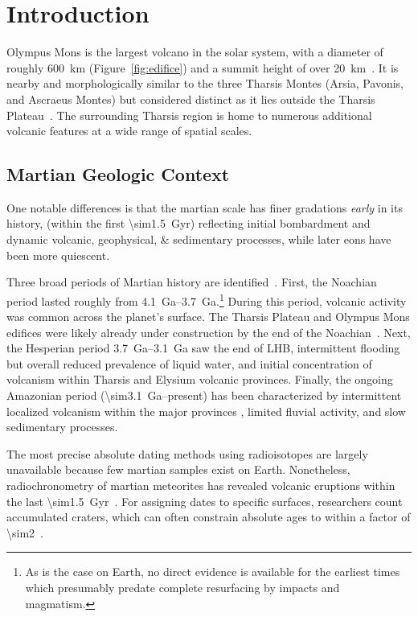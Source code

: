 \chapter{Introduction}

Olympus Mons is the largest volcano in the solar system, with a diameter of roughly \qty{600}{\km} (Figure~\ref{fig:edifice}) and a summit height of over \qty{20}{\km}~\parencite{plescia_morphometric_2004}. It is nearby and morphologically similar to the three Tharsis Montes (Arsia, Pavonis, and Ascraeus Montes) but considered distinct as it lies outside the Tharsis Plateau~\parencite{bleacher_trends_2007}. The surrounding Tharsis region is home to numerous additional volcanic features at a wide range of spatial scales.

\section{Martian Geologic Context}

One notable differences is that the martian scale has finer gradations \textit{early} in its history, (within the first \qty{\sim1.5}{Gyr}) reflecting initial bombardment and dynamic volcanic, geophysical, \& sedimentary processes, while later eons have been more quiescent. 

Three broad periods of Martian history are identified~\parencite{carr_geologic_2010}. First, the Noachian period lasted roughly from \qtyrange{4.1}{3.7}{Ga}.\footnote{As is the case on Earth, no direct evidence is available for the earliest times which presumably predate complete resurfacing by impacts and magmatism.} During this period, volcanic activity was common across the planet's surface. The Tharsis Plateau and Olympus Mons edifices were likely already under construction by the end of the Noachian~\parencite[cf.][]{isherwood_volcanic_2013,broquet_gravitational_2019}. Next, the Hesperian period \qtyrange{3.7}{3.1}{Ga} saw the end of \ac{LHB}, intermittent flooding but overall reduced prevalence of liquid water, and initial concentration of volcanism within Tharsis and Elysium volcanic provinces. Finally, the ongoing Amazonian period (\qty{\sim3.1}{Ga}--present) has been characterized by intermittent localized volcanism within the major provinces \parencite[e.g.,][]{grott_long-term_2013}, limited fluvial activity, and slow sedimentary processes.

The most precise absolute dating methods using radioisotopes are largely unavailable because few martian samples exist on Earth. Nonetheless, radiochronometry of martian meteorites has revealed volcanic eruptions within the last \qty{\sim1.5}{Gyr}~\parencite[e.g.,][]{cohen_taking_2017}. For assigning dates to specific surfaces, researchers count accumulated craters, which can often constrain absolute ages to within a factor of \num{\sim2}~\parencite[e.g.,][]{kneissl_map-projection-independent_2011}.

